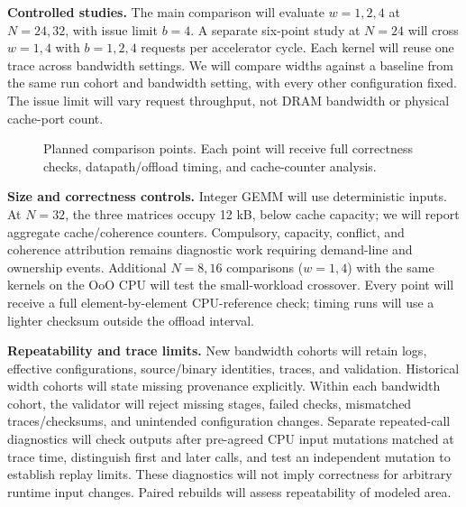 \documentclass[10pt,letterpaper]{article}
\begin{document}
\textbf{Controlled studies.} The main comparison will evaluate $w=1,2,4$ at $N=24,32$, with issue limit $b=4$. A separate six-point study at $N=24$ will cross $w=1,4$ with $b=1,2,4$ requests per accelerator cycle. Each kernel will reuse one trace across bandwidth settings. We will compare widths against a baseline from the same run cohort and bandwidth setting, with every other configuration fixed. The issue limit will vary request throughput, not DRAM bandwidth or physical cache-port count.

\begin{figure}[h!]
\centering
{}
\caption{Planned comparison points. Each point will receive full correctness checks, datapath/offload timing, and cache-counter analysis.}
\end{figure}

\textbf{Size and correctness controls.} Integer GEMM will use deterministic inputs. At $N=32$, the three matrices occupy 12 kB, below cache capacity; we will report aggregate cache/coherence counters. Compulsory, capacity, conflict, and coherence attribution remains diagnostic work requiring demand-line and ownership events. Additional $N=8,16$ comparisons ($w=1,4$) with the same kernels on the OoO CPU will test the small-workload crossover. Every point will receive a full element-by-element CPU-reference check; timing runs will use a lighter checksum outside the offload interval.

\textbf{Repeatability and trace limits.} New bandwidth cohorts will retain logs, effective configurations, source/binary identities, traces, and validation. Historical width cohorts will state missing provenance explicitly. Within each bandwidth cohort, the validator will reject missing stages, failed checks, mismatched traces/checksums, and unintended configuration changes. Separate repeated-call diagnostics will check outputs after pre-agreed CPU input mutations matched at trace time, distinguish first and later calls, and test an independent mutation to establish replay limits. These diagnostics will not imply correctness for arbitrary runtime input changes. Paired rebuilds will assess repeatability of modeled area.
\end{document}
